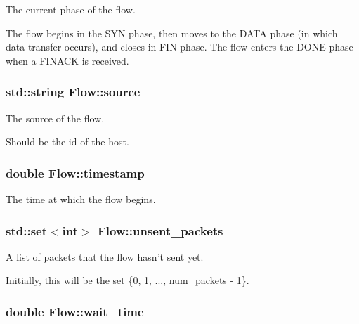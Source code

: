 \-The current phase of the flow. 

\-The flow begins in the \-S\-Y\-N phase, then moves to the \-D\-A\-T\-A phase (in which data transfer occurs), and closes in \-F\-I\-N phase. \-The flow enters the \-D\-O\-N\-E phase when a \-F\-I\-N\-A\-C\-K is received. \hypertarget{classFlow_a36eb3e23b0804647c30be41835b790b3}{
\subsubsection[{source}]{\setlength{\rightskip}{0pt plus 5cm}std\-::string {\bf \-Flow\-::source}}}\label{classFlow_a36eb3e23b0804647c30be41835b790b3}


\-The source of the flow. 

\-Should be the id of the host. \hypertarget{classFlow_a502b4455d485a1a0325d21d246183bb1}{
\subsubsection[{timestamp}]{\setlength{\rightskip}{0pt plus 5cm}double {\bf \-Flow\-::timestamp}}}\label{classFlow_a502b4455d485a1a0325d21d246183bb1}


\-The time at which the flow begins. 

\hypertarget{classFlow_a1ba2d0548e0c0af4e587d5b8d00f90fc}{
\subsubsection[{unsent\-\_\-packets}]{\setlength{\rightskip}{0pt plus 5cm}std\-::set$<$int$>$ {\bf \-Flow\-::unsent\-\_\-packets}}}\label{classFlow_a1ba2d0548e0c0af4e587d5b8d00f90fc}


\-A list of packets that the flow hasn't sent yet. 

\-Initially, this will be the set \{0, 1, ..., num\-\_\-packets -\/ 1\}. \hypertarget{classFlow_a6187616182361456eec5e91ff0480db6}{
\subsubsection[{wait\-\_\-time}]{\setlength{\rightskip}{0pt plus 5cm}double {\bf \-Flow\-::wait\-\_\-time}}}\label{classFlow_a6187616182361456eec5e91ff0480db6}


